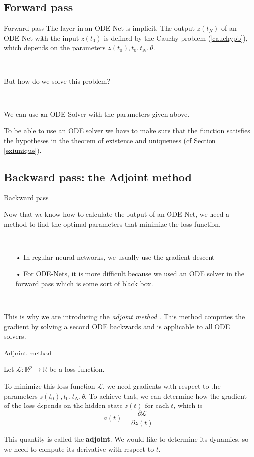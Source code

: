 \documentclass[11pt]{beamer}
\begin{document}
\subsection{Forward pass}
\begin{frame}{Forward pass}
The layer in an ODE-Net is implicit. The output $z(t_N)$ of an ODE-Net with the input $z(t_0)$ is defined by the Cauchy problem (\ref{cauchypb}), which depends on the parameters $z(t_0),t_0,t_N,\theta$.

~
\begin{center}
But how do we solve this problem?
\end{center}


~

We can use an ODE Solver with the parameters given above.

To be able to use an ODE solver we have to make sure that the function satisfies the hypotheses in the theorem of existence and uniqueness (cf Section \ref{exiunique}).
\end{frame}

\subsection{Backward pass: the Adjoint method}
\begin{frame}{Backward pass}

Now that we know how to calculate the output of an ODE-Net, we need a method to find the optimal parameters that minimize the loss function.

~
\begin{itemize}
\item[•] In regular neural networks, we usually use the gradient descent
\item[•] For ODE-Nets, it is more difficult because we used an ODE solver in the forward pass which is some sort of black box.
\end{itemize}

~

This is why we are introducing the \textit{adjoint method} \cite{1}. This method computes the gradient by solving a second ODE backwards and is applicable to all ODE solvers.

\end{frame}
\begin{frame}{Adjoint method}

Let $\mathcal{L} : \mathbb{R}^p \rightarrow \mathbb{R}$ be a loss function. 

To minimize this loss function $\mathcal{L}$, we need gradients with respect to the parameters $z(t_0),t_0,t_N,\theta$. To achieve that, we can determine how the gradient of the loss depends on the hidden state $z(t)$ for each $t$, which is
\begin{equation}
a(t)= \frac{\partial \mathcal{L}}{\partial z(t)}
\end{equation}

This quantity is called the \textbf{adjoint}. We would like to determine its dynamics, so we need to compute its derivative with respect to $t$.

\end{frame}
\end{document}
